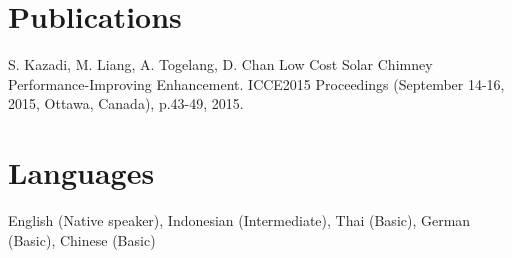 \documentclass[letterpaper, 10pt]{article}
\begin{document}


\section{Publications}
\begin{flushleft}
  \hspace*{.6em}S. Kazadi, M. Liang, A. Togelang, D. Chan Low Cost Solar Chimney Performance-Improving Enhancement. ICCE2015 Proceedings (September 14-16, 2015, Ottawa, Canada), p.43-49, 2015.
\end{flushleft}



\section{Languages}
\begin{flushleft}
  \hspace*{.6em}English (Native speaker), Indonesian (Intermediate), Thai (Basic), German (Basic), Chinese (Basic)
\end{flushleft}
\end{document}
